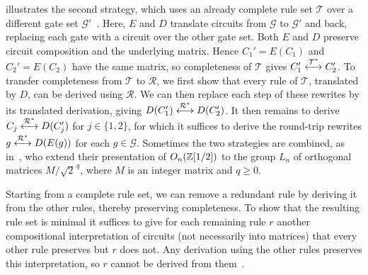 \documentclass[acmsmall,screen,nonacm]{acmart}
\begin{document}
 illustrates the second strategy, which uses an already complete rule set $\mathcal{T}$ over a different gate set $\mathcal{G}'$~\cite{bian2023cliffordt2,bian2023cliffordcs3,clement2026realcliffordch,amy2024toffoli,blake2026simpler,clement2023complete,clement2024extensions,delorme2026control,schober2026control,blake2026qudit}. Here, $E$ and $D$ translate circuits from $\mathcal{G}$ to $\mathcal{G}'$ and back, replacing each gate with a circuit over the other gate set. Both $E$ and $D$ preserve circuit composition and the underlying matrix. Hence $C_1'=E(C_1)$ and $C_2'=E(C_2)$ have the same matrix, so completeness of $\mathcal{T}$ gives $C_1'\overset{\mathcal{T}^{*}}{\longleftrightarrow}C_2'$. To transfer completeness from $\mathcal{T}$ to $\mathcal{R}$, we first show that every rule of $\mathcal{T}$, translated by $D$, can be derived using $\mathcal{R}$. We can then replace each step of these rewrites by its translated derivation, giving $D(C_1')\overset{\mathcal{R}^{*}}{\longleftrightarrow}D(C_2')$. 
It then remains to derive $C_j\overset{\mathcal{R}^{*}}{\longleftrightarrow}D(C_j')$ for $j\in\{1,2\}$, for which it suffices to derive the round-trip rewrites $g\overset{\mathcal{R}^{*}}{\longleftrightarrow}D(E(g))$ for each $g\in\mathcal{G}$.
Sometimes the two strategies are combined, as in~\citet{li2021on}, who extend their presentation of $O_n(\mathbb{Z}[1/2])$ to the group $L_n$ of orthogonal matrices $M/\sqrt2^{\,q}$, where $M$ is an integer matrix and $q\ge0$.

Starting from a complete rule set, we can remove a redundant rule by deriving it from the other rules, thereby preserving completeness. To show that the resulting rule set is minimal it suffices to give for each remaining rule $r$ another compositional interpretation of circuits (not necessarily into matrices) that every other rule preserves but $r$ does not. Any derivation using the other rules preserves this interpretation, so $r$ cannot be derived from them~\cite{clement2024minimal,blake2026simpler}.
 



\end{document}
